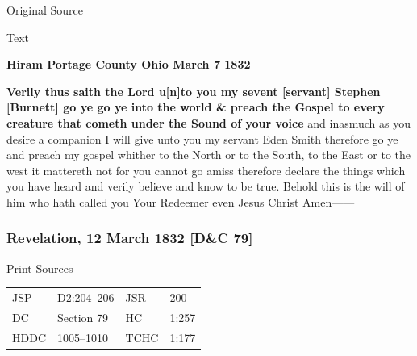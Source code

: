 			\begin{description}
				\item[Original Source]
			\end{description}
			
			
			\begin{description}
				\item[Text]
			\end{description}
			
				\textbf{Hiram Portage County Ohio March 7 1832}
				
				\textbf{Verily thus saith the Lord u[n]to you my sevent [servant] Stephen [Burnett] go ye go ye into the world \& preach the Gospel to every creature that cometh under the Sound of your voice} and inasmuch as you desire a companion I will give unto you my servant Eden Smith therefore go ye and preach my gospel whither to the North or to the South, to the East or to the west it mattereth not for you cannot go amiss therefore declare the things which you have heard and verily believe and know to be true. Behold this is the will of him who hath called you Your Redeemer even Jesus Christ Amen------
				
		\subsubsection{Revelation, 12 March 1832 [D\&C 79]}
			\label{EMS-1832-JS-12-MAR-1832}
		
			\begin{description}
				\item[Print Sources]
			\end{description}

				\begin{tabular}{p{0.5in}p{1in}p{0.5in}p{1in}}
				JSP	 	& D2:204--206	& JSR 		& 200 \\
				DC	 	& Section 79 	& HC 		& 1:257 \\
				HDDC 	& 1005--1010	& TCHC 		& 1:177 \\
				\end{tabular}
			
